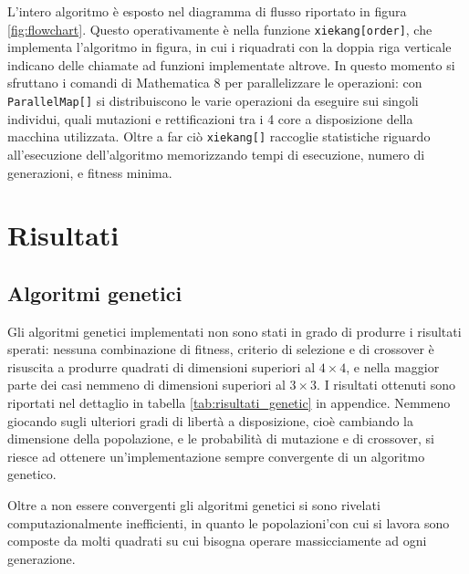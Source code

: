 \documentclass[italian,twoside,twocolumn]{article}
\begin{document}
L'intero algoritmo è esposto nel diagramma di flusso riportato in figura \ref{fig:flowchart}. Questo operativamente è nella funzione \texttt{xiekang[order]}, che implementa l'algoritmo in figura, in cui i riquadrati con la doppia riga verticale indicano delle chiamate ad funzioni implementate altrove. In questo momento si sfruttano i comandi di Mathematica 8 per parallelizzare le operazioni: con \texttt{ParallelMap[]} si distribuiscono le varie operazioni da eseguire sui singoli individui, quali mutazioni e rettificazioni tra i 4 core a disposizione della macchina utilizzata. Oltre a far ciò \texttt{xiekang[]} raccoglie statistiche riguardo all'esecuzione dell'algoritmo memorizzando tempi di esecuzione, numero di generazioni, e fitness minima.  	 

\section{Risultati}

\subsection{Algoritmi genetici}
Gli algoritmi genetici implementati non sono stati in grado di produrre i risultati sperati: nessuna combinazione di fitness, criterio di selezione e di crossover è risuscita a produrre quadrati di dimensioni superiori al $ 4\times 4 $, e nella maggior parte dei casi nemmeno di dimensioni superiori al $ 3\times 3 $. I risultati ottenuti sono riportati nel dettaglio in tabella \ref{tab:risultati_genetic} in appendice. Nemmeno giocando sugli ulteriori gradi di libertà a disposizione, cioè cambiando la dimensione della popolazione, e le probabilità di mutazione e di crossover, si riesce ad ottenere un'implementazione sempre convergente di un algoritmo genetico. 

Oltre a non essere convergenti gli algoritmi genetici si sono rivelati computazionalmente inefficienti, in quanto le popolazioni'con cui si lavora sono composte da molti quadrati su cui bisogna operare massicciamente ad ogni generazione. 

\end{document}
